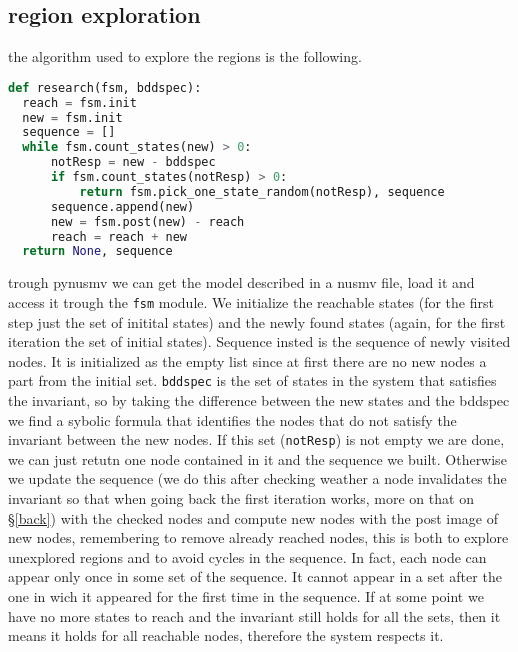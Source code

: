 \documentclass[9pt,oneside]{amsart}
\begin{document}
\begin{multicols}{2}
\section{region exploration}\label{explore}
the algorithm used to explore the regions is the following.
\begin{lstlisting}[language=Python]
def research(fsm, bddspec):
  reach = fsm.init
  new = fsm.init
  sequence = []
  while fsm.count_states(new) > 0:
      notResp = new - bddspec
      if fsm.count_states(notResp) > 0:
          return fsm.pick_one_state_random(notResp), sequence
      sequence.append(new)
      new = fsm.post(new) - reach
      reach = reach + new
  return None, sequence
\end{lstlisting}\label{code:reachable}
trough pynusmv we can get the model described in a nusmv file, load it
and access it trough the \texttt{fsm} module. We initialize the
reachable states (for the first step just the set of initital states)
and the newly found states (again, for the first iteration the set of
initial states). Sequence insted is the sequence of newly visited
nodes. It is initialized as the empty list since at first there are no
new nodes a part from the initial set. \texttt{bddspec} is the set of
states in the system that satisfies the invariant, so by taking the
difference between the new states and the bddspec we find a sybolic
formula that identifies the nodes that do not satisfy the invariant
between the new nodes. If this set (\texttt{notResp}) is not empty we
are done, we can just retutn one node contained in it and the sequence
we built. Otherwise we update the sequence (we do this after checking
weather a node invalidates the invariant so that when going back the
first iteration works, more on that on \S\ref{back}) with the checked
nodes and compute new nodes with the post image of new nodes,
remembering to remove already reached nodes, this is both to explore
unexplored regions and to avoid cycles in the sequence. In fact, each
node can appear only once in some set of the sequence. It cannot
appear in a set after the one in wich it appeared for the first time
in the sequence. If at some point we have no more states to reach and
the invariant still holds for all the sets, then it means it holds for
all reachable nodes, therefore the system respects it.


\end{multicols}
\end{document}
